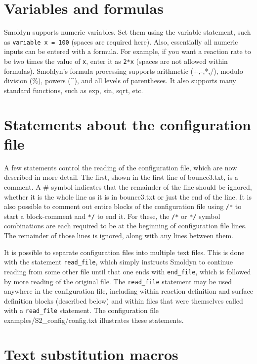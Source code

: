 \documentclass {book}
\newcommand {\ttt} {\texttt}
\begin{document}
\section{Variables and formulas}

Smoldyn supports numeric variables. Set them using the variable statement, such as \ttt{variable x = 100} (spaces are required here). Also, essentially all numeric inputs can be entered with a formula. For example, if you want a reaction rate to be two times the value of \ttt{x}, enter it as \ttt{2*x} (spaces are not allowed within formulas). Smoldyn's formula processing supports arithmetic (+,-,*,/), modulo division (\%), powers (\^{}), and all levels of parentheses. It also supports many standard functions, such as exp, sin, sqrt, etc.

\section{Statements about the configuration file}

A few statements control the reading of the configuration file, which are now described in more detail. The first, shown in the first line of bounce3.txt, is a comment. A \# symbol indicates that the remainder of the line should be ignored, whether it is the whole line as it is in bounce3.txt or just the end of the line. It is also possible to comment out entire blocks of the configuration file using \ttt{/*} to start a block-comment and \ttt{*/} to end it. For these, the \ttt{/*} or \ttt{*/} symbol combinations are each required to be at the beginning of configuration file lines. The remainder of those lines is ignored, along with any lines between them.

It is possible to separate configuration files into multiple text files. This is done with the statement \ttt{read\_file}, which simply instructs Smoldyn to continue reading from some other file until that one ends with \ttt{end\_file}, which is followed by more reading of the original file. The \ttt{read\_file} statement may be used anywhere in the configuration file, including within reaction definition and surface definition blocks (described below) and within files that were themselves called with a \ttt{read\_file} statement. The configuration file examples/S2\_config/config.txt illustrates these statements.

\section{Text substitution macros}
\end{document}
